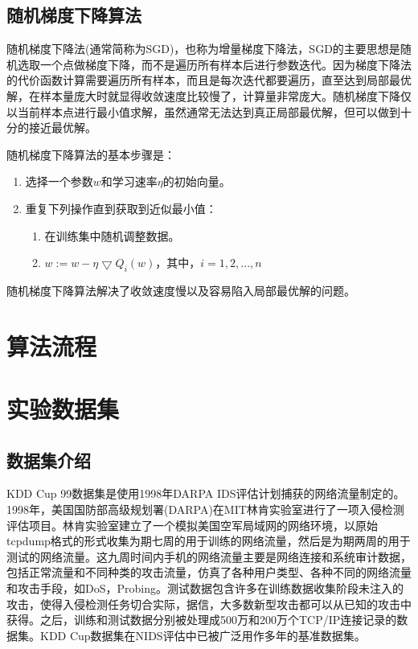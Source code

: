 \subsection{随机梯度下降算法}

随机梯度下降法(通常简称为SGD)，也称为增量梯度下降法，SGD的主要思想是随机选取一个点做梯度下降，而不是遍历所有样本后进行参数迭代。因为梯度下降法的代价函数计算需要遍历所有样本，而且是每次迭代都要遍历，直至达到局部最优解，在样本量庞大时就显得收敛速度比较慢了，计算量非常庞大。随机梯度下降仅以当前样本点进行最小值求解，虽然通常无法达到真正局部最优解，但可以做到十分的接近最优解。

随机梯度下降算法的基本步骤是：
\begin{enumerate}
    \item 选择一个参数$w$和学习速率$\eta$的初始向量。
    \item 重复下列操作直到获取到近似最小值：
    \begin{enumerate}
        \item 在训练集中随机调整数据。
        \item $w := w - \eta \bigtriangledown Q_i(w)$，其中，$i = 1,2,...,n$
    \end{enumerate}
\end{enumerate}

随机梯度下降算法解决了收敛速度慢以及容易陷入局部最优解的问题。

\section{算法流程}

\section{实验数据集}

\subsection{数据集介绍}

KDD Cup 99数据集是使用1998年DARPA IDS评估计划捕获的网络流量制定的。1998年，美国国防部高级规划署(DARPA)在MIT林肯实验室进行了一项入侵检测评估项目。林肯实验室建立了一个模拟美国空军局域网的网络环境，以原始tcpdump格式的形式收集为期七周的用于训练的网络流量，然后是为期两周的用于测试的网络流量。这九周时间内手机的网络流量主要是网络连接和系统审计数据，包括正常流量和不同种类的攻击流量，仿真了各种用户类型、各种不同的网络流量和攻击手段，如DoS，Probing。测试数据包含许多在训练数据收集阶段未注入的攻击，使得入侵检测任务切合实际，据信，大多数新型攻击都可以从已知的攻击中获得。之后，训练和测试数据分别被处理成500万和200万个TCP/IP连接记录的数据集。KDD Cup数据集在NIDS评估中已被广泛用作多年的基准数据集。

